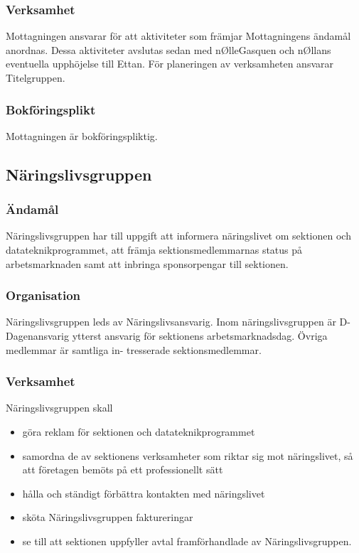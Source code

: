 \documentclass{dgovdoc}
\begin{document}
\subsubsection{Verksamhet}

Mottagningen ansvarar för att aktiviteter som främjar Mottagningens ändamål
anordnas. Dessa aktiviteter avslutas sedan med nØlleGasquen och nØllans
eventuella upphöjelse till Ettan. För planeringen av verksamheten ansvarar
Titelgruppen.

\subsubsection{Bokföringsplikt}

Mottagningen är bokföringspliktig.

\subsection{Näringslivsgruppen}

\subsubsection{Ändamål}

Näringslivsgruppen har till uppgift att informera näringslivet om sektionen och
datateknikprogrammet, att främja sektionsmedlemmarnas status på arbetsmarknaden
samt att inbringa sponsorpengar till sektionen.

\subsubsection{Organisation}

Näringslivsgruppen leds av Näringslivsansvarig. Inom näringslivsgruppen är D-Dagenansvarig
ytterst ansvarig för sektionens arbetsmarknadsdag. Övriga medlemmar är samtliga in-
tresserade sektionsmedlemmar.

\subsubsection{Verksamhet}

Näringslivsgruppen skall

\begin{itemize}
  \item göra reklam för sektionen och datateknikprogrammet
  \item samordna de av sektionens verksamheter som riktar sig mot näringslivet,
    så att företagen bemöts på ett professionellt sätt
  \item hålla och ständigt förbättra kontakten med näringslivet
  \item sköta Näringslivsgruppen faktureringar
  \item se till att sektionen uppfyller avtal framförhandlade av
    Näringslivsgruppen.
\end{itemize}
\end{document}
